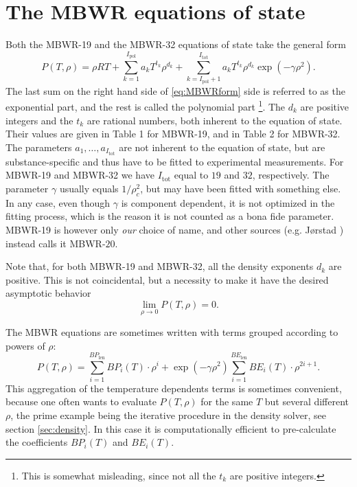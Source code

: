 \documentclass[internal,english]{sintefmemo2012}
\newcommand{\lp}{\left(}
\newcommand{\rp}{\right)}
\numberwithin{equation}{section}
\begin{document}
\section{The MBWR equations of state}
Both the MBWR-19 and the MBWR-32 equations of state take the general
form
\begin{equation}
  \label{eq:MBWRform}
  P(T,\rho) = \rho R T + \sum_{k=1}^{I_{\mathrm{pol}}} a_k T^{t_k} \rho^{d_k} +\sum_{k=I_{\mathrm{pol}}+1}^{I_{\mathrm{tot}}} a_k T^{t_k} \rho^{d_k} \exp \lp -\gamma \rho^2 \rp.
\end{equation}
The last sum on the right hand side of \eqref{eq:MBWRform} side is referred
to as the exponential part, and the rest is called the polynomial
part%
\footnote{This is somewhat misleading, since not all the $t_k$ are
  positive integers.}. %
The $d_k$ are positive integers and the $t_k$ are rational numbers,
both inherent to the equation of state. Their values are given in
Table 1 for MBWR-19, and in Table 2
for MBWR-32. The parameters $a_1,\ldots,a_{I_{\mathrm{tot}}}$ are not
inherent to the equation of state, but are substance-specific and thus have to be fitted to experimental measurements. For MBWR-19 and MBWR-32 we have
$I_{\mathrm{tot}}$ equal to $19$ and $32$, respectively. The
parameter $\gamma$ usually equals $1/\rho_{c}^2$, but may have been
fitted with something else. In any case, even though $\gamma$ is
component dependent, it is not optimized in the fitting process, which
is the reason it is not counted as a bona fide parameter. MBWR-19 is
however only \textit{our} choice of name, and other sources (e.g.
J{\o}rstad \cite{Jorstad93}) instead calls it MBWR-$20$.

Note that, for both MBWR-19 and MBWR-32, all the density exponents $d_k$ are positive. This is not coincidental, but a necessity to make it have the desired asymptotic behavior
$$
\lim_{\rho \to 0} P(T,\rho) = 0.
$$

The MBWR equations are sometimes written with terms grouped according
to powers of $\rho$:
\begin{equation}
  \label{eq:bpbeform}
  P(T,\rho) = \sum_{i=1}^{BP_\text{len}}BP_i(T) \cdot \rho^i
  + \exp(-\gamma \rho^2) \sum_{i=1}^{BE_\text{len}} BE_i(T) \cdot \rho^{2i+1}.
\end{equation}
This aggregation of the temperature dependents terms is sometimes
convenient, because one often wants to evaluate $P(T,\rho)$ for the same $T$
but several different $\rho$, the prime example being the iterative procedure in the density
solver, see section \ref{sec:density}. In this case it is
computationally efficient to pre-calculate the coefficients $BP_i(T)$
and $BE_i(T)$.
\end{document}
